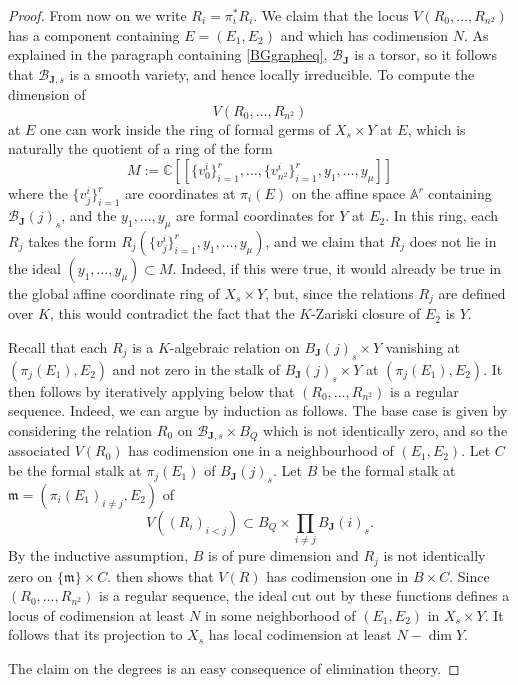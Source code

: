 \documentclass[10pt,a4paper]{amsart}
\begin{document}
\begin{proof}
From now on we write $R_{i} = \pi^{*}_{i} R_{i}$. We claim that the locus $V(R_{0}, \hdots, R_{n^2})$ has a component containing $E = (E_{1}, E_{2})$ and which has codimension $N$. As explained in the paragraph containing \eqref{BGgrapheq}, $\mathcal{B}_{\mathbf{J}}$ is a torsor, so it follows that $\mathcal{B}_{\mathbf{J},s}$ is a smooth variety, and hence locally irreducible. To compute the dimension of $$V(R_{0}, \hdots, R_{n^2})$$ at $E$ one can work inside the ring of formal germs of $X_{s} \times Y$ at $E$, which is naturally the quotient of a ring of the form
\begin{displaymath}
  M:=   \mathbb{C}[[\{ v^{i}_{0} \}^{r}_{i=1}, \hdots, \{ v^{i}_{n^2} \}^{r}_{i=1}, y_{1}, \hdots, y_{\mu} ]]
\end{displaymath}
where the $\{ v^{i}_{j} \}^{r}_{i=1}$ are coordinates at $\pi_{i}(E)$ on the affine space $\mathbb{A}^{r}$ containing $\mathcal{B}_{\mathbf{J}}(j)_{s}$, and the $y_{1}, \hdots, y_{\mu}$ are formal coordinates for $Y$ at $E_{2}$. In this ring, each $R_{j}$ takes the form $R_{j}(\{ v^{i}_{j} \}^{r}_{i=1}, y_{1}, \hdots, y_{\mu})$, and we claim that $R_j$ does not lie in the ideal $(y_1,\dots, y_\mu) \subset M$. Indeed, if this were true, it would already be true in the global affine coordinate ring of $X_s\times Y$, but, since the relations $R_j$ are defined over $K$, this would contradict the fact that the $K$-Zariski closure of $E_{2}$ is $Y$.



Recall that each $R_j$ is a $K$-algebraic relation on $B_{\mathbf{J}}(j)_{s} \times Y$ vanishing at $(\pi_j(E_1),E_2)$ and not zero in the stalk of $B_{\mathbf{J}}(j)_{s} \times Y$ at $(\pi_{j}(E_{1}), E_{2})$.  It then follows by iteratively applying  below that $(R_{0}, \hdots, R_{n^2})$ is a regular sequence. Indeed, we can argue by induction as follows. The base case is given by considering the relation $R_0$ on $\mathcal{B}_{\mathbf{J}, {s}}\times B_Q$ which is not identically zero, and so the associated $V(R_0)$ has codimension one in a neighbourhood of $(E_1, E_2)$. Let $C$ be the formal stalk at $\pi_j(E_1)$ of $B_{\mathbf{J}}(j)_{s}$. Let $B$ be the formal stalk at $\mathfrak{m}=(\pi_i(E_1)_{i\neq j},E_2)$ of 
\begin{displaymath}
V ((R_i)_{i< j} ) \subset  B_Q \times \prod_{i\neq j} B_{\mathbf{J}}(i)_{s} .
\end{displaymath}
 By the inductive assumption, $B$ is of pure dimension and  $R_j$ is not identically zero on $\{ \mathfrak{m} \} \times C$.  then shows that $V(R)$ has codimension one in $B\times C$. Since $(R_{0}, \hdots, R_{n^2})$ is a regular sequence, the ideal cut out by these functions defines a locus of codimension at least $N$ in some neighborhood of $(E_1,E_2)$ in $X_s\times Y$. It follows that its projection to $X_{s}$ has local codimension at least $N - \dim Y$. 

The claim on the degrees is an easy consequence of elimination theory.
\end{proof}
\end{document}
